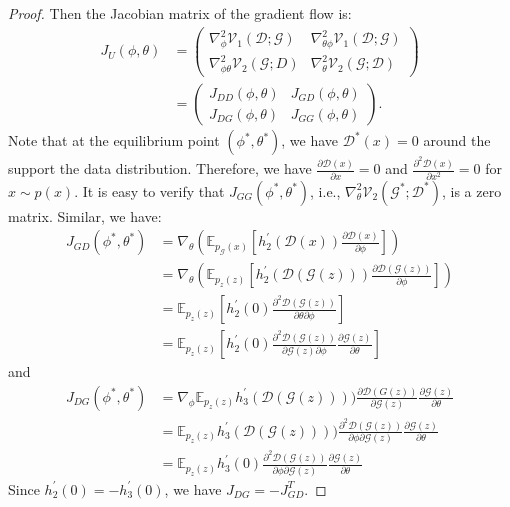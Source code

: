 \documentclass{article}
\newcommand{\ep}{\mathbb{E}}
\newcommand{\xG}{\mathcal{G}}
\newcommand{\xD}{\mathcal{D}}
\newcommand{\uV}{\mathcal{V}}
\theoremstyle{definition}
\begin{document}
\begin{proof}
	Then the Jacobian matrix of the gradient flow is:
	\begin{align}
	J_U(\phi, \theta) &= \begin{pmatrix}
	\nabla^2_{\phi} \uV_1(\xD; \xG) & \nabla^2_{\theta\phi} \uV_1(\xD; \xG) \\
	\nabla^2_{\phi\theta} \uV_2(\xG; D) & \nabla^2_{\theta} \uV_2(\xG; \xD)
	\end{pmatrix} \\
	& = \begin{pmatrix}
	J_{DD}(\phi, \theta) & J_{GD}(\phi, \theta) \\
	J_{DG}(\phi, \theta) & J_{GG}(\phi, \theta)
	\end{pmatrix}.
	\end{align}	
	Note that at the equilibrium point $(\phi^*, \theta^*)$, we have $\xD^*(x) = 0$ around the support the data distribution. Therefore, we have $\frac{\partial \xD(x)}{\partial x} = 0$ and $\frac{\partial^2 \xD(x)}{\partial x^2} = 0$ for $x\sim p(x)$. It is easy to verify that $J_{GG}(\phi^*, \theta^*)$, i.e., $\nabla^2_{\theta} \uV_2(\xG^*; \xD^*)$, is a zero matrix. Similar, we have:
	\begin{align}
	J_{GD}(\phi^*, \theta^*) &= \nabla_\theta (\ep_{p_\xG(x)}[h_2^\prime(\xD(x))\frac{\partial \xD(x)}{\partial \phi}])\nonumber \\
	&=   \nabla_\theta (\ep_{p_z(z)}[h_2^\prime(\xD(\xG(z)))\frac{\partial \xD(\xG(z))}{\partial \phi}])\nonumber \\
	& = \ep_{p_z(z)}[h_2^\prime(0)\frac{\partial^2 \xD(\xG(z))}{\partial \theta \partial \phi}] \nonumber\\
	& = \ep_{p_z(z)}[h_2^\prime(0)\frac{\partial^2 \xD(\xG(z))}{\partial \xG(z) \partial \phi}\frac{\partial \xG(z)}{\partial \theta}]
	\end{align}
	and
	\begin{align}
	J_{DG}(\phi^*, \theta^*) &= \nabla_\phi  \ep_{p_z(z)}h_3^\prime(\xD(\xG(z))))\frac{\partial \xD(G(z))}{\partial \xG(z)} \frac{\partial \xG(z)}{\partial \theta} \nonumber\\
	&= 	 \ep_{p_z(z)}h_3^\prime(\xD(\xG(z))))\frac{\partial^2 \xD(\xG(z))}{\partial \phi \partial \xG(z)} \frac{\partial \xG(z)}{\partial \theta} \nonumber \\
	&= 	 \ep_{p_z(z)}h_3^\prime(0)\frac{\partial^2 \xD(\xG(z))}{\partial \phi \partial \xG(z)} \frac{\partial \xG(z)}{\partial \theta}
	\end{align}
	Since $h_2^\prime(0) = - h_3^\prime(0)$, we have $J_{DG} = - J_{GD}^T$.
		

\end{proof}
\end{document}
